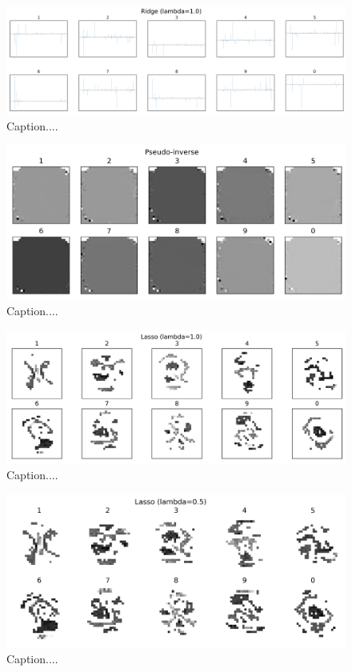 \documentclass[10pt]{article}
\begin{document}
\begin{figure}[ht]
\centerline{\includegraphics[scale=0.5]{figures/bar_plot_loadings_ridge.png}}
\caption{Caption....}
\label{fig8b}
\end{figure}

\begin{figure}[ht]
\centerline{\includegraphics[scale=0.75]{figures/weight_matrix_pinv_no_zeros.png}}
\caption{Caption....}
\label{fig9}
\end{figure}

\begin{figure}[ht]
\centerline{\includegraphics[scale=0.75]{figures/weight_matrix_lasso_1_no_zeros.png}}
\caption{Caption....}
\label{fig10}
\end{figure}

\begin{figure}[ht]
\centerline{\includegraphics[scale=0.75]{figures/weight_matrix_lasso_05_no_zeros.png}}
\caption{Caption....}
\label{fig11}
\end{figure}
\end{document}
